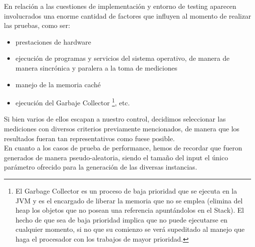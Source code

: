 En relación a las cuestiones de implementación y entorno de testing aparecen involucrados una enorme cantidad de factores que influyen al momento de realizar las pruebas, como ser:
\begin {itemize}
\item prestaciones de hardware
\item ejecución de programas y servicios del sistema operativo, de manera de manera sincrónica y paralera a la toma de mediciones
\item manejo de la memoria caché
\item ejecución del Garbaje Collector \footnote{El Garbage Collector es un proceso de baja prioridad que se ejecuta en la JVM y es el encargado de liberar la memoria que no se emplea (elimina del heap los objetos que no posean una referencia apuntándolos en el Stack). El hecho de que sea de baja prioridad implica que no puede ejecutarse en cualquier momento, si no que su comienzo se verá supeditado al manejo que haga el procesador con los trabajos de mayor prioridad. }, etc.
\end{itemize}

Si bien varios de ellos escapan a nuestro control, decidimos seleccionar las mediciones con diversos criterios previamente mencionados, de manera que los resultados fueran tan representativos como fuese posible.\\

En cuanto a los casos de prueba de performance, hemos de recordar que fueron generados de manera pseudo-aleatoria, siendo el tamaño del input el único parámetro ofrecido para la generación de las diversas instancias.\\

